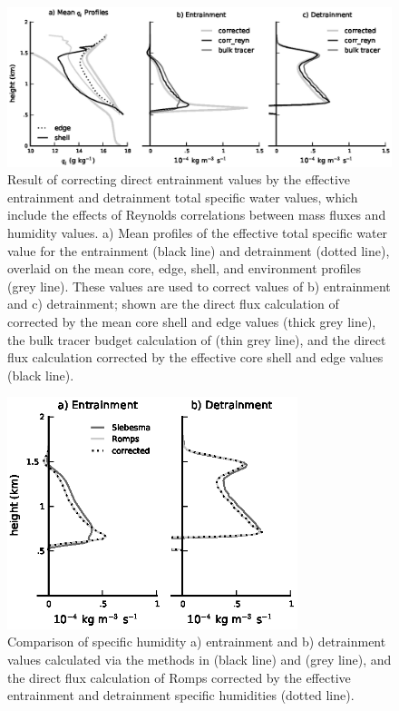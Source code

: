 \documentclass[draft,grl]{agutex}
\begin{document}
\begin{figure}
  \label{fig:Reynolds_correction}
  \noindent\includegraphics[width=39pc]{./figures/reynolds_correction}
  \caption{Result of correcting direct entrainment values by the effective 
  entrainment and detrainment total specific water values, which include the 
  effects of Reynolds correlations between mass fluxes and humidity values.
  a) Mean profiles of the effective total specific water value for 
  the entrainment (black line) and detrainment (dotted line), overlaid on the 
  mean core, edge, shell, and environment profiles (grey line).  These 
  values are used to correct values of b) entrainment and c) detrainment; shown 
  are the direct flux calculation of \cite{Romps2010} corrected by the mean 
  core shell and edge values (thick grey line), the bulk tracer budget 
  calculation of \cite{Siebesma1995} (thin grey line), and the direct flux 
  calculation corrected by the effective core shell and edge values (black 
  line).}
\end{figure}

\begin{figure}
  \label{fig:numerical_correction}
  \noindent\includegraphics[width=20pc]{./figures/numerical_correction}
  \caption{Comparison of specific humidity a) entrainment and b) detrainment 
  values calculated via the methods in \cite{Siebesma1995} (black line) and 
  \cite{Romps2010} (grey line), and the direct flux calculation of Romps 
  corrected by the effective entrainment and detrainment specific humidities
  (dotted line).
  }
\end{figure}
\end{document}
